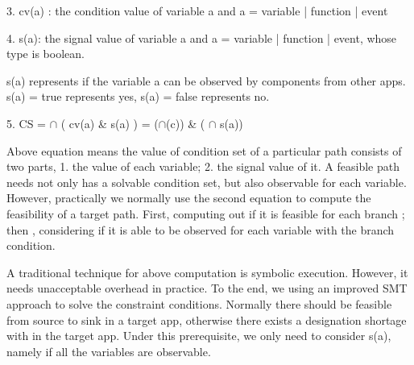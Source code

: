 \documentclass{sig-alternate-05-2015}
\begin{document}
3. cv(a) : the condition value of variable a and a = variable | function | event

4. s(a): the signal value of variable a and a = variable | function | event, whose type is boolean.

s(a) represents if the variable a can be observed by components from other apps. s(a) = true represents yes, s(a) = false represents no.

5. CS = $\cap$ ( cv(a) \& s(a) ) = ($\cap$(c)) \& ( $\cap$ s(a))

Above equation means the value of condition set of a particular path consists of two parts, 1. the value of each variable; 2. the signal value of it. A feasible path needs not only has a solvable condition set, but also observable for each variable. However, practically we normally use the second equation to compute the feasibility of a target path. First, computing out if it is feasible for each branch ; then , considering if it is able to be observed for each variable with the branch condition.

A traditional technique for above computation is symbolic execution. However, it needs unacceptable overhead in practice. {\color {red} To the end, we using an improved SMT approach to solve the constraint conditions.} Normally there should be feasible from source to sink in a target app, otherwise there exists a designation shortage with in the target app. Under this prerequisite, we only need to consider s(a), namely if all the variables are observable. 



%
%
\end{document}

